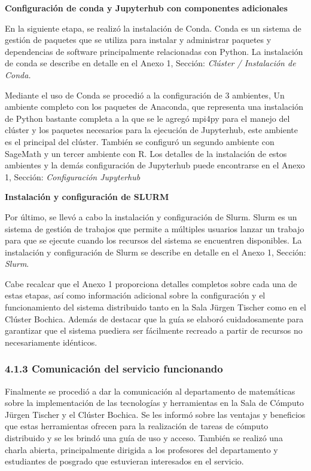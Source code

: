 \begin{spacing}{1.5}
  \textbf{Configuración de conda y Jupyterhub con componentes adicionales}

  En la siguiente etapa, se realizó la instalación de Conda. Conda es un sistema de gestión de paquetes que se utiliza para instalar y administrar paquetes y dependencias de software principalmente relacionadas con Python. La instalación de conda se describe en detalle en el Anexo 1, Sección: \textit{Clúster / Instalación de Conda.}

  Mediante el uso de Conda se procedió a la configuración de 3 ambientes, Un ambiente completo con los paquetes de Anaconda, que representa una instalación de Python bastante completa a la que se le agregó mpi4py para el manejo del clúster y los paquetes necesarios para la ejecución de Jupyterhub, este ambiente es el principal del clúster. También se configuró un segundo ambiente con SageMath y un tercer ambiente con R. Los detalles de la instalación de estos ambientes y la demás configuración de Jupyterhub puede encontrarse en el Anexo 1, Sección: \textit{Configuración Jupyterhub}

  \textbf{Instalación y configuración de SLURM}

  Por último, se llevó a cabo la instalación y configuración de Slurm. Slurm es un sistema de gestión de trabajos que permite a múltiples usuarios lanzar un trabajo para que se ejecute cuando los recursos del sistema se encuentren disponibles. La instalación y configuración de Slurm se describe en detalle en el Anexo 1, Sección: \textit{Slurm}.

  Cabe recalcar que el Anexo 1 proporciona detalles completos sobre cada una de estas etapas, así como información adicional sobre la configuración y el funcionamiento del sistema distribuido tanto en la Sala Jürgen Tischer como en el Clúster Bochica. Además de destacar que la guía se elaboró cuidadosamente para garantizar que el sistema puediera ser fácilmente recreado a partir de recursos no necesariamente idénticos.

  \subsubsection{4.1.3 Comunicación del servicio funcionando}

  Finalmente se procedió a dar la comunicación al departamento de matemáticas sobre la implementación de las tecnologías y herramientas en la Sala de Cómputo Jürgen Tischer y el Clúster Bochica. Se les informó sobre las ventajas y beneficios que estas herramientas ofrecen para la realización de tareas de cómputo distribuido y se les brindó una guía de uso y acceso. También se realizó una charla abierta, principalmente dirigida a los profesores del departamento y estudiantes de posgrado que estuvieran interesados en el servicio.


\end{spacing}
